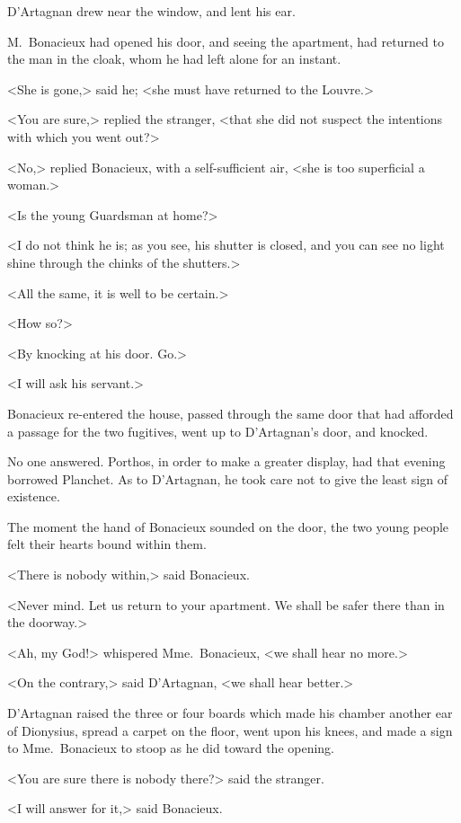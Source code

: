 D'Artagnan drew near the window, and lent his ear. 

M.~Bonacieux had opened his door, and seeing the apartment, had returned to the man in the cloak, whom he had left alone for an instant. 

<She is gone,> said he; <she must have returned to the Louvre.> 

<You are sure,> replied the stranger, <that she did not suspect the intentions with which you went out?> 

<No,> replied Bonacieux, with a self-sufficient air, <she is too superficial a woman.> 

<Is the young Guardsman at home?> 

<I do not think he is; as you see, his shutter is closed, and you can see no light shine through the chinks of the shutters.> 

<All the same, it is well to be certain.> 

<How so?> 

<By knocking at his door. Go.> 

<I will ask his servant.> 

Bonacieux re-entered the house, passed through the same door that had afforded a passage for the two fugitives, went up to D'Artagnan's door, and knocked. 

No one answered. Porthos, in order to make a greater display, had that evening borrowed Planchet. As to D'Artagnan, he took care not to give the least sign of existence. 

The moment the hand of Bonacieux sounded on the door, the two young people felt their hearts bound within them. 

<There is nobody within,> said Bonacieux. 

<Never mind. Let us return to your apartment. We shall be safer there than in the doorway.> 

<Ah, my God!> whispered Mme.~Bonacieux, <we shall hear no more.> 

<On the contrary,> said D'Artagnan, <we shall hear better.> 

D'Artagnan raised the three or four boards which made his chamber another ear of Dionysius, spread a carpet on the floor, went upon his knees, and made a sign to Mme.~Bonacieux to stoop as he did toward the opening. 

<You are sure there is nobody there?> said the stranger. 

<I will answer for it,> said Bonacieux. 

